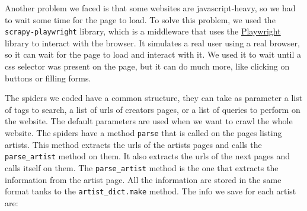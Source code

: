\documentclass[tikz,14pt]{article}
\begin{document}
Another problem we faced is that some websites are javascript-heavy, so we had to wait some time for the page to load.
To solve this problem, we used the \verb|scrapy-playwright| library, which is a middleware that uses the \href{https://playwright.dev/}{Playwright} library to interact with the browser.
It simulates a real user using a real browser, so it can wait for the page to load and interact with it. 
We used it to wait until a css selector was present on the page, but it can do much more, like clicking on buttons or filling forms.

The spiders we coded have a common structure, they can take as parameter a list of tags to search, 
a list of urls of creators pages, or a list of queries to perform on the website.
The default parameters are used when we want to crawl the whole website.
The spiders have a method \texttt{parse} that is called on the pages listing artists.
This method extracts the urls of the artists pages and calls the \texttt{parse_artist} method on them.
It also extracts the urls of the next pages and calls itself on them.
The \texttt{parse_artist} method is the one that extracts the information from the artist page.
All the information are stored in the same format tanks to the \texttt{artist_dict.make} method.
The info we save for each artist are:
\end{document}
